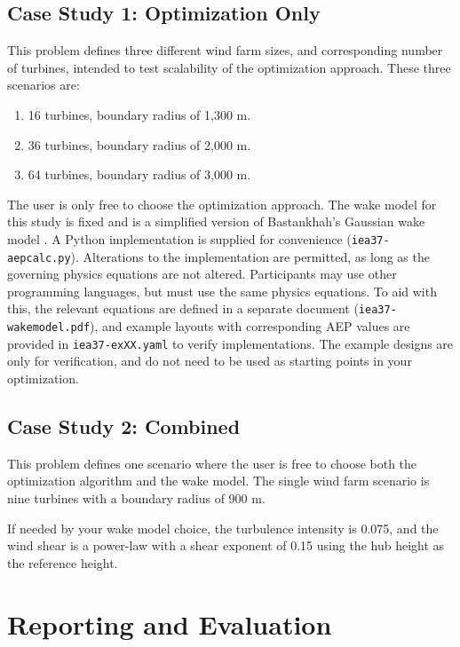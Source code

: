 \documentclass{article}
\begin{document}
    \subsection{Case Study 1: Optimization Only}

        This problem defines three different wind farm sizes, and corresponding number of turbines, intended to test scalability of the optimization approach.  These three scenarios are:
        \begin{enumerate}
            \item 16 turbines, boundary radius of 1,300 m.
            \item 36 turbines, boundary radius of 2,000 m.
            \item 64 turbines, boundary radius of 3,000 m.
        \end{enumerate}

        The user is only free to choose the optimization approach.  The wake model for this study is fixed and is a simplified version of Bastankhah's Gaussian wake model \cite{Thomas2018, Bastankhah2014, Bastankhah2016}.  A Python implementation is supplied for convenience (\texttt{iea37-aepcalc.py}). Alterations to the implementation are permitted, as long as the governing physics equations are not altered.  Participants may use other programming languages, but must use the same physics equations.  To aid with this, the relevant equations are defined in a separate document (\texttt{iea37-wakemodel.pdf}), and example layouts with corresponding AEP values are provided in \texttt{iea37-exXX.yaml} to verify implementations.  The example designs are only for verification, and do not need to be used as starting points in your optimization.  

    \subsection{Case Study 2: Combined}

        This problem defines one scenario where the user is free to choose both the optimization algorithm and the wake model.  The single wind farm scenario is nine turbines with a boundary radius of 900 m.
        
        If needed by your wake model choice, the turbulence intensity is 0.075, and the wind shear is a power-law with a shear exponent of 0.15 using the hub height as the reference height.

\section{Reporting and Evaluation}
\end{document}
